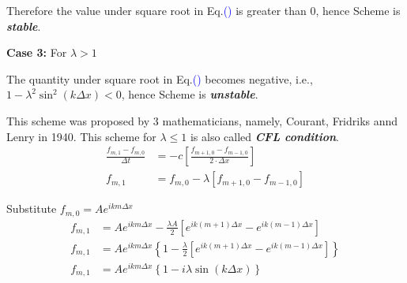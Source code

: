 \documentclass[fleqn,10pt]{SelfArx} %
\newcommand{\myeqref}[1]{Eq.\textcolor{blue}{\textup{(\getrefnumber{#1})}}}
\begin{document}
Therefore the value under square root in \myeqref{eq:15.8} is greater than 0, hence Scheme is \textbf{\textit{stable}}.
\begin{table}[h]
    \centering
    \renewcommand{\arraystretch}{1.5}
    \caption{Comparison of different modes and solutions for \( \lambda = 1 \)}
    \label{tab:modesforlamdaequalto1}
\end{table}

\textbf{Case 3:} For \( \lambda > 1 \)

The quantity under square root in \myeqref{eq:15.8} becomes negative, i.e., \( 1- \lambda^2 \sin^2(k\Delta x) < 0 \), hence Scheme is \textbf{\textit{unstable}}.

This scheme was proposed by 3 mathematicians, namely, Courant, Fridriks annd Lenry in 1940. This scheme for \(\lambda \leq 1\) is also called \textbf{\textit{CFL condition}}. \\

\begin{align*}
	\frac{f_{m,1} - f_{m,0}}{\Delta t} &= -c\left[\frac{f_{m+1,0} - f_{m-1,0}}{2 \cdot \Delta x}\right] \tag{17.1} \label{eq:17.1} \\
	f_{m,1} &= f_{m,0} - \lambda \left[f_{m+1,0} - f_{m-1,0}\right] \tag{17.2} \label{eq:17.2}
\end{align*}

Substitute $f_{m,0} = A e^{ikm \Delta x}$
\begin{align*}
	f_{m,1} &= Ae^{ikm\Delta x} - \frac{\lambda A}{2}\left[e^{ik(m+1)\Delta x} - e^{ik(m-1)\Delta x}\right] \\
	f_{m,1} &= Ae^{ikm\Delta x}\left\{1 - \frac{\lambda}{2}\left[e^{ik(m+1)\Delta x} - e^{ik(m-1)\Delta x}\right]\right\} \\
	f_{m,1} &= Ae^{ikm\Delta x}\left\{1 - i\lambda\sin(k\Delta x)\right\} \tag{17.3} \label{eq:17.3}
\end{align*}
\end{document}
